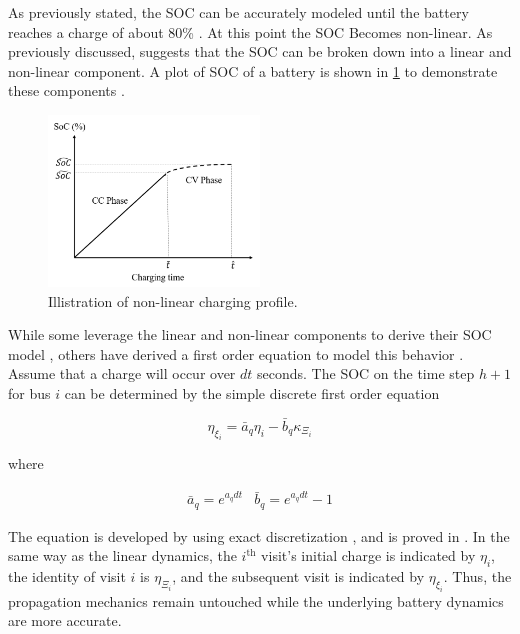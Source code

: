 \documentclass[ee,msthesis]{usuthesis}
\begin{document}
As previously stated, the SOC can be accurately modeled until the battery reaches a charge of about 80\%
\cite{liu-2020-batter-elect}. At this point the SOC Becomes non-linear. As previously discussed,
\cite{zhang-2021-optim-elect} suggests that the SOC can be broken down into a linear and non-linear component. A plot
of SOC of a battery is shown in \ref{fig:soc-plot} to demonstrate these components \cite{zhang-2021-optim-elect}.

\begin{figure}[htbp]
\centering
\includegraphics[width=0.5\textwidth]{img/soc-plot.png}
\caption{\label{fig:soc-plot}Illistration of non-linear charging profile.}
\end{figure}

While some leverage the linear and non-linear components to derive their SOC model \cite{abdollahi-2016-optim-batter},
others have derived a first order equation to model this behavior \cite{whitaker-2023-a-network}. Assume that a charge
will occur over \(dt\) seconds. The SOC on the time step \(h+1\) for bus \(i\) can be determined by the simple discrete first
order equation

\begin{equation}
  \eta_{\xi_i} = \bar{a}_q \eta_i - \bar{b}_q \kappa_{\Xi_i}
\end{equation}

where

\begin{equation}
\begin{array}{cc}
  \bar{a}_q = e^{a_q dt} & \bar{b}_q = e^{a_q dt} - 1
\end{array}
\end{equation}

The equation is developed by using exact discretization \cite{hespanha-2018-linear}, and is proved in
\cite{whitaker-2023-a-network}. In the same way as the linear dynamics, the \(i^{\text{th}}\) visit's initial charge is
indicated by \(\eta_i\), the identity of visit \(i\) is \(\eta_{\Xi_i}\), and the subsequent visit is indicated by \(\eta_{\xi_i}\). Thus,
the propagation mechanics remain untouched while the underlying battery dynamics are more accurate.
\end{document}
